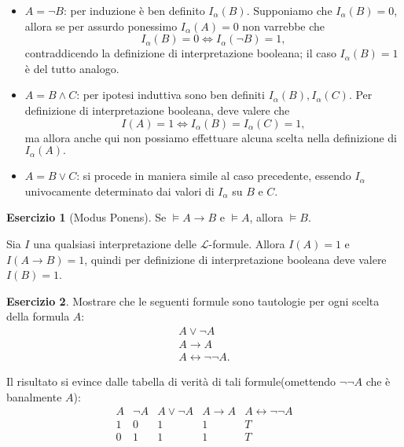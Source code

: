 \documentclass[a4paper]{article}
\newcommand{\limplies}{\rightarrow}
\newcommand{\liff}{\leftrightarrow}
\theoremstyle{definition}
\theoremstyle{definition}
\theoremstyle{remark}
\theoremstyle{definition}
\newtheorem{exercise}{Esercizio}[section]
\begin{document}
\begin{itemize}
	\item \(A=\lnot B\): per induzione è ben definito $I_{\alpha}\left( B \right).$ Supponiamo che \(I_{\alpha}\left( B \right)=0\), allora se per assurdo ponessimo \(I_{\alpha}\left( A \right)=0\) non
		varrebbe che \[ I_{\alpha}\left( B \right) = 0 \iff I_{\alpha}\left( \lnot B \right) = 1,\] contraddicendo la definizione di interpretazione booleana; il caso
		\(I_{\alpha}\left( B \right) = 1\) è del tutto analogo.
	\item \(A=B\land C\): per ipotesi induttiva sono ben definiti $I_{\alpha}\left( B \right), I_{\alpha}\left( C \right) $. Per definizione di interpretazione booleana, deve
		valere che $$ I\left( A \right) =1 \iff I_{\alpha}\left( B \right) =I_{\alpha}\left( C \right)=1  ,$$
		ma allora anche qui non possiamo effettuare alcuna scelta nella definizione di $I_{\alpha}\left( A \right) .$
	\item \(A=B\lor C\): si procede in maniera simile al caso precedente, essendo $I_{\alpha}$ univocamente determinato dai valori di $I_{\alpha}$ su $B$ e $C$.
\end{itemize}
\setcounter{exercise}{13}
\begin{exercise}[Modus Ponens]
	Se $\models A\limplies B$ e $\models A$, allora $\models B$.
\end{exercise}
Sia $I$ una qualsiasi interpretazione delle $\mathcal{L}$-formule. Allora $I(A)=1$ e $I(A\limplies B)=1$, quindi per definizione di interpretazione booleana deve valere $I(B)=1$.
\begin{exercise}
Mostrare che le seguenti formule sono tautologie per ogni scelta della formula $A$:
\begin{align*}
	A\lor\lnot A\\
	A\limplies A\\
	A\liff \lnot\lnot A
.\end{align*}
\end{exercise}
Il risultato si evince dalle tabella di verità di tali formule(omettendo $\lnot\lnot A$ che è banalmente $A$):
\begin{displaymath}
\begin{array}{c|cccc}
A & \lnot A & A\lor\lnot A & A\limplies A & A\liff \lnot\lnot A\\
\hline
1 & 0 & 1 & 1 & T\\
0 & 1 & 1 & 1 & T\\
\end{array}
\end{displaymath}
\end{document}
